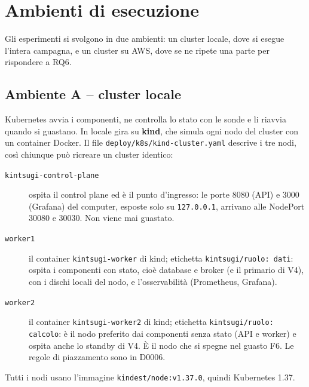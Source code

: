 \chapter{Ambienti di esecuzione}
\label{cap:deployment}

Gli esperimenti si svolgono in due ambienti: un cluster locale, dove si esegue l'intera campagna, e un cluster su AWS, dove se ne ripete una parte per rispondere a RQ6.

\section{Ambiente A -- cluster locale}

Kubernetes avvia i componenti, ne controlla lo stato con le sonde e li riavvia quando si guastano. In locale gira su \textbf{kind}, che simula ogni nodo del cluster con un container Docker. Il file \texttt{deploy/k8s/kind-cluster.yaml} descrive i tre nodi, così chiunque può ricreare un cluster identico:

\begin{description}
  \item[\texttt{kintsugi-control-plane}] ospita il control plane ed è il punto d'ingresso: le porte 8080 (API) e 3000 (Grafana) del computer, esposte solo su \texttt{127.0.0.1}, arrivano alle NodePort 30080 e 30030. Non viene mai guastato.
  \item[\texttt{worker1}] il container \texttt{kintsugi-worker} di kind; etichetta \texttt{kintsugi/ruolo: dati}: ospita i componenti con stato, cioè database e broker (e il primario di V4), con i dischi locali del nodo, e l'osservabilità (Prometheus, Grafana).
  \item[\texttt{worker2}] il container \texttt{kintsugi-worker2} di kind; etichetta \texttt{kintsugi/ruolo: calcolo}: è il nodo preferito dai componenti senza stato (API e worker) e ospita anche lo standby di V4. È il nodo che si spegne nel guasto F6. Le regole di piazzamento sono in D0006.
\end{description}

Tutti i nodi usano l'immagine \texttt{kindest/node:v1.37.0}, quindi Kubernetes 1.37.

